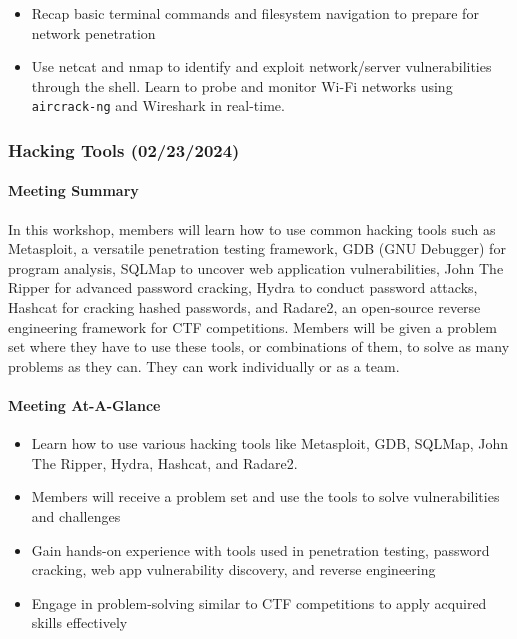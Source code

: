 \documentclass[
  letterpaper,
  DIV=11,
  numbers=noendperiod]{scrartcl}
\let\oldparagraph\paragraph
\renewcommand{\paragraph}[1]{\oldparagraph{#1}\mbox{}}
\providecommand{\tightlist}{%
  \setlength{\itemsep}{0pt}\setlength{\parskip}{0pt}}\usepackage{longtable,booktabs,array}
\begin{document}
\begin{itemize}
\tightlist
\item
  Recap basic terminal commands and filesystem navigation to prepare for
  network penetration
\item
  Use netcat and nmap to identify and exploit network/server
  vulnerabilities through the shell. Learn to probe and monitor Wi-Fi
  networks using \texttt{aircrack-ng} and Wireshark in real-time.
\end{itemize}

\hypertarget{hacking-tools-02232024}{%
\subsubsection{Hacking Tools
(02/23/2024)}\label{hacking-tools-02232024}}

\hypertarget{meeting-summary-15}{%
\paragraph{Meeting Summary}\label{meeting-summary-15}}

In this workshop, members will learn how to use common hacking tools
such as Metasploit, a versatile penetration testing framework, GDB (GNU
Debugger) for program analysis, SQLMap to uncover web application
vulnerabilities, John The Ripper for advanced password cracking, Hydra
to conduct password attacks, Hashcat for cracking hashed passwords, and
Radare2, an open-source reverse engineering framework for CTF
competitions. Members will be given a problem set where they have to use
these tools, or combinations of them, to solve as many problems as they
can. They can work individually or as a team.

\hypertarget{meeting-at-a-glance-15}{%
\paragraph{Meeting At-A-Glance}\label{meeting-at-a-glance-15}}

\begin{itemize}
\tightlist
\item
  Learn how to use various hacking tools like Metasploit, GDB, SQLMap,
  John The Ripper, Hydra, Hashcat, and Radare2.
\item
  Members will receive a problem set and use the tools to solve
  vulnerabilities and challenges
\item
  Gain hands-on experience with tools used in penetration testing,
  password cracking, web app vulnerability discovery, and reverse
  engineering
\item
  Engage in problem-solving similar to CTF competitions to apply
  acquired skills effectively
\end{itemize}
\end{document}
